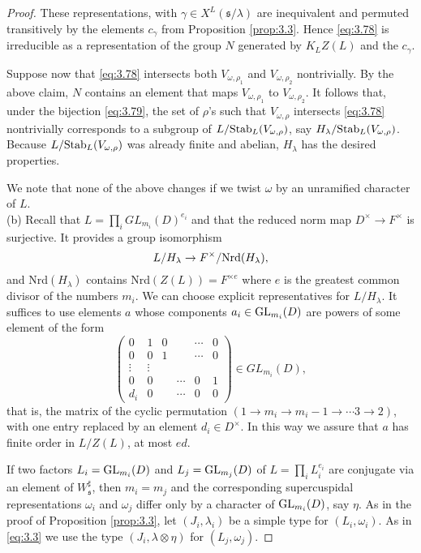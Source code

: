 \documentclass[11pt]{amsart}
\theoremstyle{definition}
\begin{document}
\begin{proof}
These representations, with $\gamma \in X^L ({{\mathfrak s}} / \lambda)$ are inequivalent and 
permuted transitively by the elements $c_\gamma$ from Proposition \ref{prop:3.3}. 
Hence \eqref{eq:3.78} is irreducible as a representation of the group $N$ generated 
by $K_L Z(L)$ and the $c_\gamma$.

Suppose now that \eqref{eq:3.78} intersects both $V_{\omega,\rho_1}$ and 
$V_{\omega,\rho_2}$ nontrivially. By the above claim, $N$ contains
an element that maps $V_{\omega,\rho_1}$ to $V_{\omega,\rho_2}$. It follows that,
under the bijection \eqref{eq:3.79}, 
the set of $\rho$'s such that $V_{\omega,\rho}$ intersects \eqref{eq:3.78} 
nontrivially corresponds to a subgroup of $L / {{\rm Stab}}_L (V_{\omega,\rho})$, 
say $H_\lambda / {{\rm Stab}}_L (V_{\omega,\rho})$. Because $L / {{\rm Stab}}_L (V_{\omega,\rho})$
was already finite and abelian, $H_\lambda$ has the desired properties.

We note that none of the above changes if we twist $\omega$ by an unramified
character of $L$.\\
(b) Recall that $L = \prod_i GL_{m_i} (D)^{e_i}$ and that the reduced norm map
$D^\times \to F^\times$ is surjective. It provides a group isomorphism
\[
L / H_\lambda \to F^\times / {{\rm Nrd}} (H_\lambda) ,
\]
and Nrd$(H_\lambda)$ contains Nrd$(Z(L)) = F^{\times e}$ where $e$ is the 
greatest common divisor of the numbers $m_i$. We can choose explicit 
representatives for $L / H_\lambda$. It suffices to use elements $a$ whose 
components $a_i \in {{\rm GL}}_{m_i} (D)$ are powers of some element of the form 
\[
\begin{pmatrix}
0 & 1 & 0 & & \cdots & 0  \\
0 & 0 & 1 & & \cdots & 0 \\
\vdots & \vdots \\
0 & 0 & & \cdots & 0 & 1 \\
d_i & 0 & & \cdots & 0 & 0
\end{pmatrix} \in GL_{m_i}(D) ,
\]
that is, the matrix of the cyclic permutation $(1 \to m_i \to m_i - 1 \to  
\cdots 3 \to 2)$, with one entry replaced by an element $d_i \in D^\times$. 
In this way we assure that $a$ has finite order in $L / Z(L)$, at most $e d$. 

If two factors $L_i = {{\rm GL}}_{m_i}(D)$ and $L_j = {{\rm GL}}_{m_j}(D)$ of $L = \prod_i 
L_i^{e_i}$ are conjugate via an element of $W_{{\mathfrak s}}^\sharp$, then $m_i = m_j$ and
the corresponding supercuspidal representations $\omega_i$ and $\omega_j$ differ
only by a character of ${{\rm GL}}_{m_i}(D)$, say $\eta$. As in the proof of Proposition
\ref{prop:3.3}, let $(J_i,\lambda_i)$ be a simple type for $(L_i,\omega_i)$. As in 
\eqref{eq:3.3} we use the type $(J_i,\lambda \otimes \eta)$ for $(L_j,\omega_j)$.


\end{proof}
\end{document}
